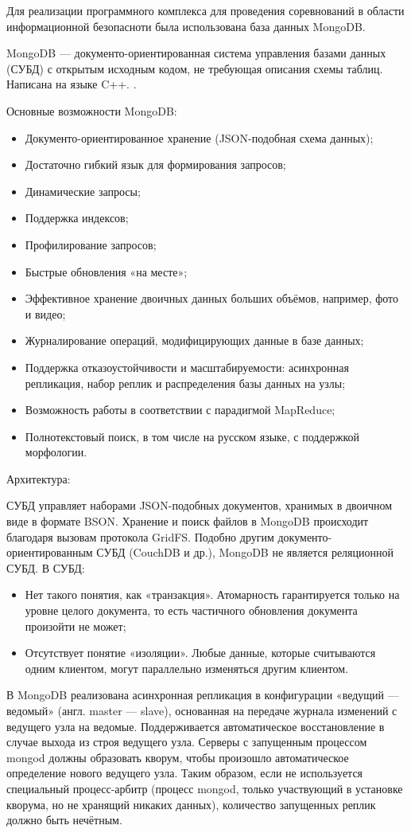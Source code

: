 Для реализации программного комплекса для проведения соревнований в области информационной безопасноти была использована база данных MongoDB.

MongoDB --- документо-ориентированная система управления базами данных (СУБД) с открытым исходным кодом, не требующая описания схемы таблиц. Написана на языке C++. \cite{mongo}.

Основные возможности MongoDB:
\begin{itemize}
\item Документо-ориентированное хранение (JSON-подобная схема данных);
\item Достаточно гибкий язык для формирования запросов;
\item Динамические запросы;
\item Поддержка индексов;
\item Профилирование запросов;
\item Быстрые обновления «на месте»;
\item Эффективное хранение двоичных данных больших объёмов, например, фото и видео;
\item Журналирование операций, модифицирующих данные в базе данных;
\item Поддержка отказоустойчивости и масштабируемости: асинхронная репликация, набор реплик и распределения базы данных на узлы;
\item Возможность работы в соответствии с парадигмой MapReduce;
\item Полнотекстовый поиск, в том числе на русском языке, с поддержкой морфологии.
\end{itemize}

Архитектура:

СУБД управляет наборами JSON-подобных документов, хранимых в двоичном виде в формате BSON. Хранение и поиск файлов в MongoDB происходит благодаря вызовам протокола GridFS. Подобно другим документо-ориентированным СУБД (CouchDB и др.), MongoDB не является реляционной СУБД. В СУБД:

\begin{itemize}
\item Нет такого понятия, как «транзакция». Атомарность гарантируется только на уровне целого документа, то есть частичного обновления документа произойти не может;
\item Отсутствует понятие «изоляции». Любые данные, которые считываются одним клиентом, могут параллельно изменяться другим клиентом.
\end{itemize}

В MongoDB реализована асинхронная репликация в конфигурации «ведущий — ведомый» (англ. master — slave), основанная на передаче журнала изменений с ведущего узла на ведомые. Поддерживается автоматическое восстановление в случае выхода из строя ведущего узла. Серверы с запущенным процессом mongod должны образовать кворум, чтобы произошло автоматическое определение нового ведущего узла. Таким образом, если не используется специальный процесс-арбитр (процесс mongod, только участвующий в установке кворума, но не хранящий никаких данных), количество запущенных реплик должно быть нечётным.
